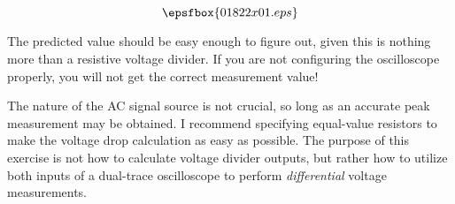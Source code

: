 

$$\epsfbox{01822x01.eps}$$

\vfil \eject






The predicted value should be easy enough to figure out, given this is nothing more than a resistive voltage divider.  If you are not configuring the oscilloscope properly, you will not get the correct measurement value!







The nature of the AC signal source is not crucial, so long as an accurate peak measurement may be obtained.  I recommend specifying equal-value resistors to make the voltage drop calculation as easy as possible.  The purpose of this exercise is not how to calculate voltage divider outputs, but rather how to utilize both inputs of a dual-trace oscilloscope to perform {\it differential} voltage measurements.




